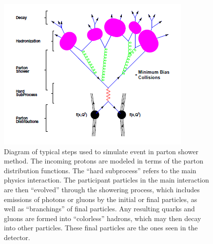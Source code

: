  \begin{figure}[htb]
  \begin{center}
    \includegraphics{Figures/mc-partonShower-lesHouches.png}
  \end{center}
  \caption[Diagram of typical steps used to simulate event in parton shower method]
	  {Diagram of typical steps used to simulate event in parton shower method.
	    The incoming protons are modeled in terms of the 
	    parton distribution functions. 
	    The ``hard subprocess'' refers to the main 
	    physics interaction.  
	    The participant particles in the main interaction 
	    are then ``evolved'' through the showering process, 
	    which includes emissions of photons or gluons 
	    by the initial or final particles, 
	    as well as ``branchings'' of final particles. %
	    Any resulting quarks and gluons are 
	    formed into ``colorless'' hadrons, 
	    which may then decay into other particles. 
	    These final particles are the ones seen 
	    in the detector.  
	  }
  \label{fig:MCsteps}
 \end{figure}



